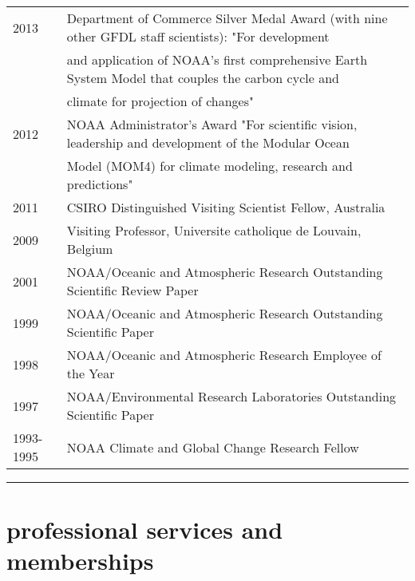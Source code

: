 \documentclass{article}
\begin{document}
\begin{tabular}{ll}
\\
  2013 & Department of Commerce Silver Medal Award (with nine other
  GFDL staff scientists): 
  "For development \\ & and application of NOAA's first comprehensive  
  Earth System Model  
  that couples the carbon cycle and \\ & climate for projection of changes" \\
  2012 & NOAA Administrator's Award "For scientific vision, leadership
  and development of 
  the Modular Ocean \\ & Model (MOM4) for climate modeling, research and
  predictions" \\
  2011 & CSIRO Distinguished Visiting Scientist Fellow, Australia \\
  2009 & Visiting Professor, Universite catholique de Louvain, Belgium\\
  2001 & NOAA/Oceanic and Atmospheric Research Outstanding Scientific
  Review Paper\\
  1999 & NOAA/Oceanic and Atmospheric Research Outstanding Scientific Paper\\
  1998 & NOAA/Oceanic and Atmospheric Research Employee of the Year\\
  1997 & NOAA/Environmental Research Laboratories Outstanding Scientific Paper\\
  1993-1995 & NOAA Climate and Global Change Research Fellow
\end{tabular}


\noindent\rule{\textwidth}{1pt}
\vspace{-1cm}
\section*{\sc  \color{Maroon}  professional services and memberships}
\vspace{-.25cm}
\end{document}
